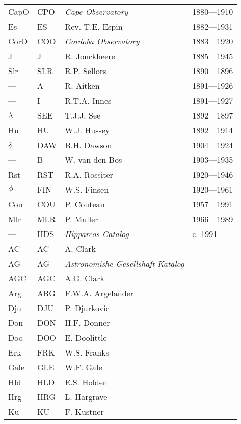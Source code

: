 \begin{longtable}{l|l|l|p{35mm}}
CapO	        	& CPO 		 & \emph{Cape Observatory} 	& 1880---1910 \\
Es 	 	        & ES  		 & Rev. T.E. Espin 		& 1882---1931 \\
CorO	   	     	& COO 		 & \emph{Cordoba Observatory} 	& 1883---1920 \\
J   	        	& J   		 & R. Jonckheere		& 1885---1945 \\
Slr   	        	& SLR 		 & R.P. Sellors 		& 1890---1896 \\
---		        & A   		 & R. Aitken 			& 1891---1926 \\
---   	        	& I   		 & R.T.A. Innes			& 1891---1927 \\
$\lambda$   	        & SEE 		 & T.J.J. See 			& 1892---1897 \\
Hu   	        	& HU  		 & W.J. Hussey 			& 1892---1914 \\
$\delta$		& DAW 		 & B.H. Dawson 			& 1904---1924 \\
---		        & B   		 & W. van den Bos 		& 1903---1935 \\
Rst   	    	    	& RST 		 & R.A. Rossiter 		& 1920---1946 \\
$\phi$		    	& FIN 		 & W.S. Finsen			& 1920---1961 \\
Cou 	        	& COU 		 & P. Couteau			& 1957---1991 \\
Mlr			& MLR		 & P. Muller 			& 1966---1989 \\
---		        & HDS  		 & \emph{Hipparcos Catalog} 	& c. 1991 \\
AC		        & AC  		 & A. Clark			&  \\
AG		        & AG  		 & \emph{Astronomishe Gesellshaft Katalog} &  \\
AGC		        & AGC 		 & A.G. Clark 			&  \\
Arg		        & ARG 		 & F.W.A. Argelander		&  \\
Dju  	        	& DJU 		 & P. Djurkovic			&  \\
Don  	        	& DON 		 & H.F. Donner 			&  \\
Doo  	        	& DOO 		 & E. Doolittle 		&  \\
Erk  	   		& FRK 		 & W.S. Franks			&  \\
Gale  	    	    	& GLE 		 & W.F. Gale 			&  \\
Hld   	        	& HLD 		 & E.S. Holden 			&  \\
Hrg   		        & HRG 		 & L. Hargrave 			&  \\
Ku  		        & KU  		 & F. Kustner 			&  \\

\end{longtable}
